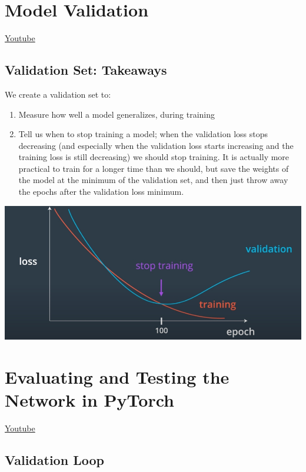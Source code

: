 \section{Model Validation}
\href{https://www.youtube.com/watch?v=Uw5DT5NmzNY&t=1s&ab_channel=Udacity}{Youtube} 

\subsection{Validation Set: Takeaways}

We create a validation set to:

\begin{enumerate}
    \item Measure how well a model generalizes, during training
    \item Tell us when to stop training a model; when the validation loss stops decreasing (and especially when the validation loss starts increasing and the training loss is still decreasing) we should stop training. It is actually more practical to train for a longer time than we should, but save the weights of the model at the minimum of the validation set, and then just throw away the epochs after the validation loss minimum.
\end{enumerate}

\includegraphics[width=1\linewidth]{img//cnn/validation.jpeg}


\section{Evaluating and Testing the Network in PyTorch}
\href{https://www.youtube.com/watch?v=2kUa3OJ_tVA&ab_channel=Udacity}{Youtube}

\subsection{Validation Loop}

